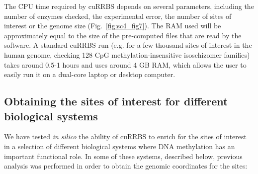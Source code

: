 \bigskip

The CPU time required by cuRRBS depends on several parameters, including the number of enzymes checked, the experimental error, the number of sites of interest or the genome size (Fig.~\ref{fig:sc4_fig7}). The RAM used will be approximately equal to the size of the pre-computed files that are read by the software. A standard cuRRBS run (e.g. for a few thousand sites of interest in the human genome, checking 128 CpG methylation-insensitive isoschizomer families) takes around 0.5-1 hours and uses around 4 \acrshort{GB} \acrshort{RAM}, which allows the user to easily run it on a dual-core laptop or desktop computer. 


\subsection*{Obtaining the sites of interest for different biological systems}

We have tested \textit{in silico} the ability of cuRRBS to enrich for the sites of interest in a selection of different biological systems where DNA methylation has an important functional role. In some of these systems, described below, previous analysis was performed in order to obtain the genomic coordinates for the sites:

